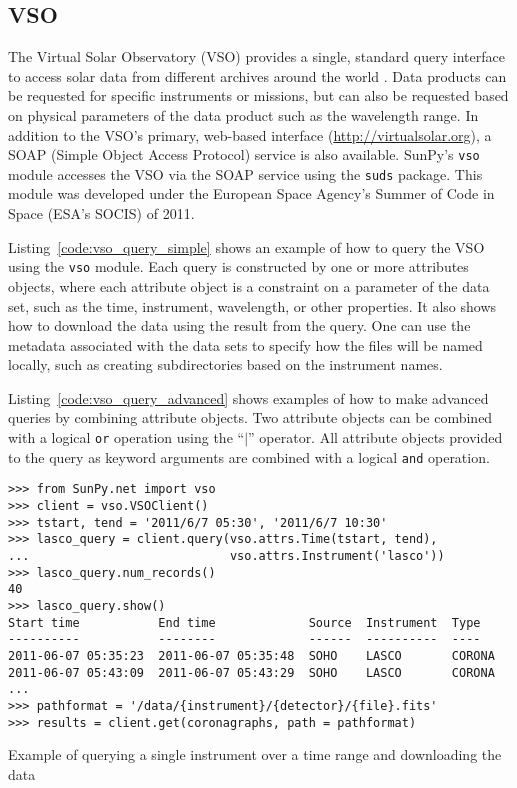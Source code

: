 \subsection{VSO}\label{ssec:vso}

The Virtual Solar Observatory (VSO) provides a single, standard query
interface to access solar data from different archives around the world
 \citep{hill2009}.
Data products can be requested for specific instruments or missions, but
can also be requested based on physical parameters of the data product such
as the wavelength range.
In addition to the VSO's primary, web-based interface
(\url{http://virtualsolar.org}), a SOAP (Simple Object Access Protocol)
service is also available.
SunPy's \texttt{vso} module accesses the VSO via the SOAP service using the
\texttt{suds} package.
This module was developed under the European Space Agency's Summer of Code in 
Space (ESA's SOCIS) of 2011.

Listing~\ref{code:vso_query_simple} shows an example of how to query the VSO
using the \texttt{vso} module.
Each query is constructed by one or more attributes objects, where each
attribute object is a constraint on a parameter of the data set, such as the
time, instrument, wavelength, or  other properties.
It also shows how to download the data using the result
from the query. One can use the metadata associated with the data sets to specify how the
files will be named locally, such as creating subdirectories based on the
instrument names.

Listing~\ref{code:vso_query_advanced} shows examples of how to make advanced
queries by combining attribute objects.
Two attribute objects can be combined with a logical \texttt{or} operation
using the ``$|$'' operator.
All attribute objects provided to the query as keyword arguments are combined
with a logical \texttt{and} operation.

\begin{listing}[H]
\begin{verbatim}
>>> from SunPy.net import vso
>>> client = vso.VSOClient()
>>> tstart, tend = '2011/6/7 05:30', '2011/6/7 10:30'
>>> lasco_query = client.query(vso.attrs.Time(tstart, tend),
...                            vso.attrs.Instrument('lasco'))
>>> lasco_query.num_records()
40
>>> lasco_query.show() 
Start time           End time             Source  Instrument  Type
----------           --------             ------  ----------  ----
2011-06-07 05:35:23  2011-06-07 05:35:48  SOHO    LASCO       CORONA
2011-06-07 05:43:09  2011-06-07 05:43:29  SOHO    LASCO       CORONA
...
>>> pathformat = '/data/{instrument}/{detector}/{file}.fits'
>>> results = client.get(coronagraphs, path = pathformat)
\end{verbatim}
\caption{Example of querying a single instrument over a time range and downloading the data}
\label{code:vso_query_simple}
\end{listing}

